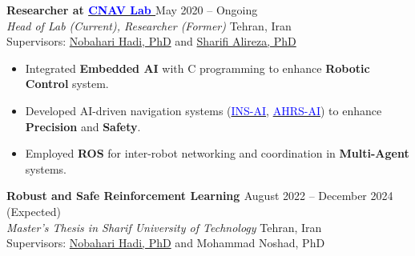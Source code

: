 \documentclass[12pt]{article}
\begin{document}
\vspace{8pt} %

\noindent
{\bfseries Researcher at
\href{https://www.linkedin.com/company/cnav-lab/}{\textcolor{blue}{CNAV Lab \faLinkedin}} \href{https://github.com/CNAVLAB}{\faGithub}
\textcolor{red}{
\href{https://youtube.com/@cnavlab?si=Fc-Y3oyKdgAmz3-5}{\faYoutube}}
} \hfill May 2020 -- Ongoing \\
\noindent \textit{Head of Lab (Current), Researcher (Former) }
\hfill Tehran, Iran \\
\noindent Supervisors:
\href{https://ae.sharif.edu/~portal/faculty/1091235256}{Nobahari Hadi, PhD} and
\href{https://ae.sharif.edu/~portal/faculty/1730782165}{Sharifi Alireza, PhD}
\vspace{-8pt}
\begin{itemize} \itemsep -4pt %
    \item Integrated \textbf{Embedded AI} with C programming to enhance \textbf{Robotic Control} system.
    \item Developed AI-driven navigation systems (\href{https://github.com/alibaniasad1999/AHRS_AI}{\textcolor{blue}{INS-AI}}, \href{https://github.com/alibaniasad1999/GPS_INS}{\textcolor{blue}{AHRS-AI}}) to enhance \textbf{Precision} and \textbf{Safety}.
    \item Employed \textbf{ROS} for inter-robot networking and coordination in \textbf{Multi-Agent} systems.
\end{itemize}
\vspace{-4pt}
\noindent
{\bfseries  Robust and Safe Reinforcement Learning
\href{https://github.com/CNAVLAB}{\faGithub}
} \hfill August 2022 -- December 2024 (Expected) \\
\noindent \textit{Master's Thesis in Sharif University of Technology} \hfill Tehran, Iran \\
\noindent Supervisors:
\href{https://ae.sharif.edu/~portal/faculty/1091235256}{Nobahari Hadi, PhD} 
{
	and
Mohammad Noshad, PhD
 }{}
\vspace{-8pt}
\end{document}
